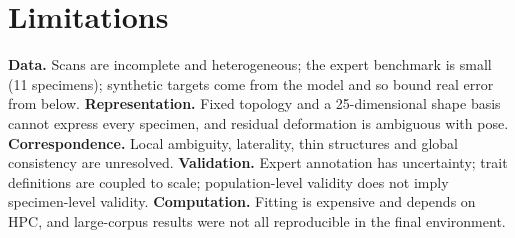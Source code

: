 \section{Limitations}
\label{sec:limitations}

\textbf{Data.} Scans are incomplete and heterogeneous; the expert benchmark
is small (11 specimens); synthetic targets come from the model and so bound
real error from below. \textbf{Representation.} Fixed topology and a
25-dimensional shape basis cannot express every specimen, and residual
deformation is ambiguous with pose. \textbf{Correspondence.} Local ambiguity,
laterality, thin structures and global consistency are unresolved.
\textbf{Validation.} Expert annotation has uncertainty; trait definitions
are coupled to scale; population-level validity does not imply
specimen-level validity. \textbf{Computation.} Fitting is expensive and
depends on HPC, and large-corpus results were not all reproducible in the
final environment.
